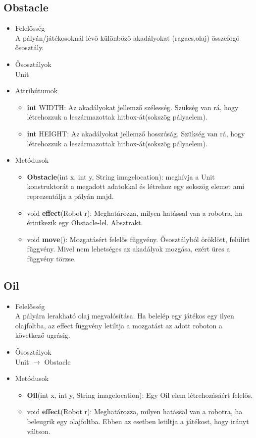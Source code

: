 \subsection{Obstacle}
\begin{itemize}
\item Felelősség\\
A pályán/játékosoknál lévő különböző akadályokat (ragacs,olaj) összefogó ősosztály.
\item Ősosztályok\\
Unit
\item Attribútumok
	\begin{itemize}
		\item \textbf{int} WIDTH: Az akadályokat jellemző szélesség. Szükség van rá, hogy létrehozzuk a leszármazottak hitbox-át(sokszög pályaelem).
		\item \textbf{int} HEIGHT: Az akadályokat jellemző hosszúság. Szükség van rá, hogy létrehozzuk a leszármazottak hitbox-át(sokszög pályaelem).
	\end{itemize}
\item Metódusok
	\begin{itemize}
		\item \textbf{Obstacle}(int x, int y, String imagelocation): meghívja a Unit konstruktorát a megadott adatokkal és létrehoz egy sokszög elemet ami reprezentálja a pályán majd.
		\item void \textbf{effect}(Robot r): Meghatározza, milyen hatással van a robotra, ha érintkezik egy Obstacle-lel. Absztrakt.
		\item void \textbf{move}(): Mozgatásért felelős függvény. Ősosztályból öröklött, felülírt függvény. Mivel nem lehetséges az akadályok mozgása, ezért üres a függvény törzse.
	\end{itemize}
\end{itemize}

\subsection{Oil}
\begin{itemize}
\item Felelősség\\
A pályára lerakható olaj megvalósítása. Ha belelép egy játékos egy ilyen olajfoltba, az effect függvény letiltja a mozgatást az adott roboton a következő ugrásig.
\item Ősosztályok\\
Unit $\rightarrow$ Obstacle 
\item Metódusok
	\begin{itemize}
		\item \textbf{Oil}(int x, int y, String imagelocation): Egy Oil elem létrehozásáért felelős.
		\item void \textbf{effect}(Robot r): Meghatározza, milyen hatással van a robotra, ha beleugrik egy olajfoltba. Ebben az esetben letiltja a játékost, hogy irányt váltson.
	\end{itemize}
\end{itemize}

